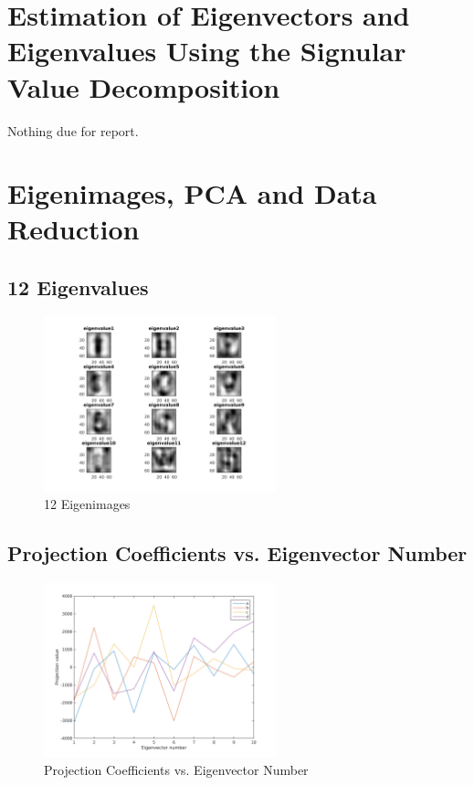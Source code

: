 \documentclass{article}
\begin{document}
\section{Estimation of Eigenvectors and Eigenvalues Using the Signular Value
Decomposition}

Nothing due for report.

\section{Eigenimages, PCA and Data Reduction}
	\subsection{12 Eigenvalues}
		\begin{figure}[h]
			\begin{center}
				\includegraphics[width=0.6\textwidth]{12eigimgs.png}
				\caption{12 Eigenimages}
			\end{center}
		\end{figure}
	\subsection{Projection Coefficients vs. Eigenvector Number}
		\begin{figure}[h]
			\begin{center}
				\includegraphics[width=0.6\textwidth]{projCoefVseigNum.png}
				\caption{Projection Coefficients vs. Eigenvector Number}
			\end{center}
		\end{figure}
\end{document}
